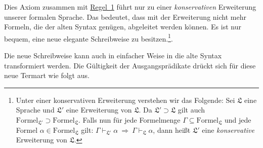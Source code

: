 \documentclass[a4paper,german,10pt,twoside]{book}
\theoremstyle{definition}
\theoremstyle{remark}
\begin{document}
Dies Axiom zusammen mit \hyperlink{rule:classDefinition}{Regel~1} f{\"u}hrt nur zu einer \emph{konservativen} Erweiterung unserer formalen Sprache. Das bedeutet, dass mit der Erweiterung nicht mehr Formeln, die der alten Syntax gen{\"u}gen, abgeleitet werden k{\"o}nnen. Es ist nur bequem, eine neue elegante Schreibweise zu besitzen.\footnote{
Unter einer konservativen Erweiterung  verstehen wir das Folgende:
Sei $\mathfrak{L}$ eine Sprache und $\mathfrak{L'}$ eine Erweiterung von $\mathfrak{L}$. Da $\mathfrak{L'} \supset \mathfrak{L}$ gilt auch $\mbox{Formel}_\mathfrak{L'} \supset \mbox{Formel}_\mathfrak{L}$. Falls nun f{\"u}r jede Formelmenge $\Gamma \subseteq \mbox{Formel}_\mathfrak{L}$ und jede Formel $\alpha \in \mbox{Formel}_\mathfrak{L}$ gilt: $\Gamma \vdash_\mathfrak{L'} \alpha \ \Rightarrow \ \Gamma \vdash_\mathfrak{L} \alpha$, dann hei{\ss}t $\mathfrak{L'}$ eine \emph{konservative} Erweiterung von $\mathfrak{L}$.}.


\par
Die neue Schreibweise kann auch in einfacher Weise in die alte Syntax transformiert werden.
Die G{\"u}ltigkeit der Ausgangspr{\"a}dikate dr{\"u}ckt sich f{\"u}r diese neue Termart wie folgt aus.
\end{document}
